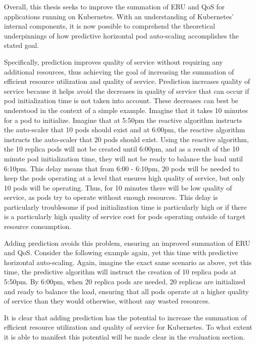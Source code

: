 Overall, this thesis seeks to improve the summation of ERU and QoS for
applications running on Kubernetes.
With an understanding of Kubernetes' internal components, it is now
possible to comprehend the theoretical underpinnings of how predictive
horizontal pod auto-scaling accomplishes the stated goal.

Specifically, prediction improves quality of service without
requiring any additional resources, thus achieving the goal of increasing the
summation of efficient resource utilization and quality of service. Prediction
increases quality of service because it helps avoid the decreases in quality of
service that can occur if pod initialization time is not taken into account.
These decreases can best be understood in the context of a simple example.
Imagine that it takes 10 minutes for a pod to initialize. Imagine that at 5:50pm
the reactive algorithm instructs the auto-scaler that 10 pods should exist and at
6:00pm, the reactive algorithm instructs the auto-scaler that 20 pods should
exist. Using the reactive algorithm, the 10 replica pods will not be created
until 6:00pm, and as a result of the 10 minute pod initialization time, they
will not be ready to balance the load until 6:10pm. This delay means that from
6:00 - 6:10pm, 20 pods will be needed to keep the pods operating at a level that
ensures high quality of service, but only 10 pods will be operating. Thus, for
10 minutes there will be low quality of service, as pods try to operate without
enough resources. This delay is particularly troublesome if pod initialization
time is particularly high or if there is a particularly high quality of service
cost for pods operating outside of target resource consumption.

Adding prediction avoids this problem, ensuring an improved summation of ERU and
QoS. Consider the following example again, yet this time with predictive
horizontal auto-scaling. Again, imagine the exact same scenario as above, yet
this time, the predictive algorithm will instruct the creation of 10 replica
pods at 5:50pm. By 6:00pm, when 20 replica pods are needed, 20 replicas are
initialized and ready to balance the load, ensuring that all pods operate at a
higher quality of service than they would otherwise, without any wasted
resources.

It is clear that adding prediction has the potential to increase the summation
of efficient resource utilization and quality of service for Kubernetes. To what
extent it is able to manifest this potential will be made clear in the
evaluation section.
